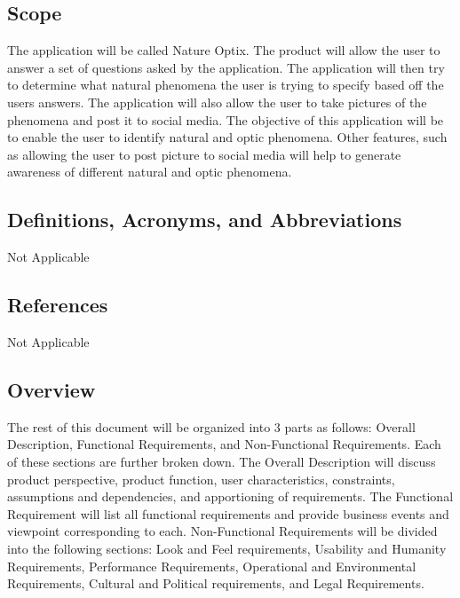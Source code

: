 \documentclass[]{article}
\begin{document}
\subsection{Scope}
\label{sub:scope}

The application will be called Nature Optix.  The product will allow the user to answer a set of questions asked by the application. The application will then try to determine what natural phenomena the user is trying to specify based off the users answers. The application will also allow the user to take pictures of the phenomena and post it to social media. The objective of this application will be to enable the user to identify natural and optic phenomena. Other features, such as allowing the user to post picture to social media will help to generate awareness of different natural and optic phenomena. 


\subsection{Definitions, Acronyms, and Abbreviations}
\label{sub:definitions_acronyms_and_abbreviations}

Not Applicable


\subsection{References}
\label{sub:references}
Not Applicable

\subsection{Overview}
\label{sub:overview}
\indent The rest of this document will be organized into 3 parts as follows: Overall Description, Functional Requirements, and Non-Functional Requirements. Each of these sections are further broken down. The Overall Description will discuss product perspective, product function, user characteristics, constraints, assumptions and dependencies, and apportioning of requirements. The Functional Requirement will list all functional requirements and provide business events and viewpoint corresponding to each. Non-Functional Requirements will be divided into the following sections: Look and Feel requirements, Usability and Humanity Requirements, Performance Requirements, Operational and Environmental Requirements, Cultural and Political requirements, and Legal Requirements. 
\end{document}

